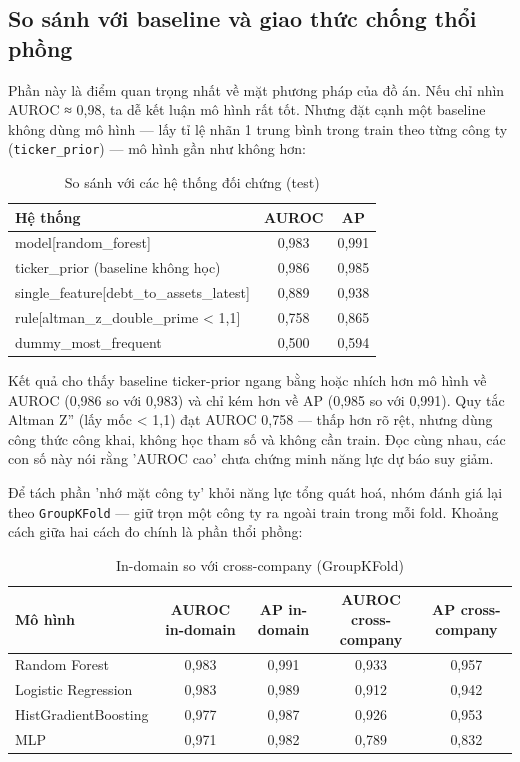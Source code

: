 \documentclass[13pt,a4paper]{extreport}
\begin{document}
\subsection{So sánh với baseline và giao thức chống thổi phồng}

Phần này là điểm quan trọng nhất về mặt phương pháp của đồ án. Nếu chỉ nhìn AUROC ≈ 0,98, ta dễ kết luận mô hình rất tốt. Nhưng đặt cạnh một baseline không dùng mô hình — lấy tỉ lệ nhãn 1 trung bình trong train theo từng công ty (\texttt{ticker\_prior}) — mô hình gần như không hơn:

\begin{table}[H]
\centering
\caption{So sánh với các hệ thống đối chứng (test)}
\begin{center}
\small
\begin{tabular}{|l|c|c|}
\hline
\textbf{Hệ thống} & \textbf{AUROC} & \textbf{AP} \\ \hline
model[random\_forest] & 0,983 & 0,991 \\ \hline
ticker\_prior (baseline không học) & 0,986 & 0,985 \\ \hline
single\_feature[debt\_to\_assets\_latest] & 0,889 & 0,938 \\ \hline
rule[altman\_z\_double\_prime < 1,1] & 0,758 & 0,865 \\ \hline
dummy\_most\_frequent & 0,500 & 0,594 \\ \hline
\end{tabular}
\end{center}
\end{table}

Kết quả cho thấy baseline ticker-prior ngang bằng hoặc nhích hơn mô hình về AUROC (0,986 so với 0,983) và chỉ kém hơn về AP (0,985 so với 0,991). Quy tắc Altman Z'' (lấy mốc < 1,1) đạt AUROC 0,758 — thấp hơn rõ rệt, nhưng dùng công thức công khai, không học tham số và không cần train. Đọc cùng nhau, các con số này nói rằng 'AUROC cao' chưa chứng minh năng lực dự báo suy giảm.

Để tách phần 'nhớ mặt công ty' khỏi năng lực tổng quát hoá, nhóm đánh giá lại theo \texttt{GroupKFold} — giữ trọn một công ty ra ngoài train trong mỗi fold. Khoảng cách giữa hai cách đo chính là phần thổi phồng:

\begin{table}[H]
\centering
\caption{In-domain so với cross-company (GroupKFold)}
\begin{center}
\footnotesize
\begin{tabular}{|l|c|c|c|c|}
\hline
\textbf{Mô hình} & \textbf{AUROC in-domain} & \textbf{AP in-domain} & \textbf{AUROC cross-company} & \textbf{AP cross-company} \\ \hline
Random Forest & 0,983 & 0,991 & 0,933 & 0,957 \\ \hline
Logistic Regression & 0,983 & 0,989 & 0,912 & 0,942 \\ \hline
HistGradientBoosting & 0,977 & 0,987 & 0,926 & 0,953 \\ \hline
MLP & 0,971 & 0,982 & 0,789 & 0,832 \\ \hline
\end{tabular}
\end{center}
\end{table}
\end{document}
